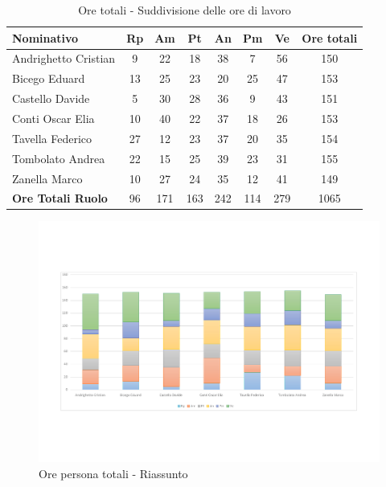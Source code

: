\documentclass[../PianoProgetto.tex]{subfiles}
\begin{document}
	\begin{table}[H]
		\begin{tabularx}{\textwidth}{l  * {6}{C}  c}
			\toprule
			\textbf{Nominativo} & \textbf{Rp} & \textbf{Am} & \textbf{Pt} 
						& \textbf{An} & \textbf{Pm} & \textbf{Ve} & \textbf{Ore totali} \\
			\midrule
			Andrighetto Cristian  & 9  & 22 & 18 & 38 & 7  & 56 & 150 \\
			Bicego Eduard  & 13 & 25 & 23 & 20 & 25 & 47 & 153 \\
			Castello Davide  & 5  & 30 & 28 & 36 & 9  & 43 & 151 \\
			Conti Oscar Elia  & 10 & 40 & 22 & 37 & 18 & 26 & 153 \\
			Tavella Federico  & 27 & 12 & 23 & 37 & 20 & 35 & 154 \\
			Tombolato Andrea  & 22 & 15 & 25 & 39 & 23 & 31 & 155 \\
			Zanella Marco & 10 & 27 & 24 & 35 & 12 & 41 & 149 \\
			\midrule
			\textbf{Ore Totali Ruolo} & 96    & 171   & 163   & 242   & 114   & 279   & 1065 \\
			\bottomrule
		\end{tabularx}
		\caption{Ore totali - Suddivisione delle ore di lavoro}
		\label{tab:totale_ore}
	\end{table}
	
\newpage
\vfill
		
	\begin{figure}[H]
		\centering
		\includegraphics[width=\textwidth , trim=2cm 4cm 2cm 4cm]{grafici/Riepilogo/Totali/ore-persona}
			\caption{Ore persona totali - Riassunto}
		\label{fig:BarChart-totale_ore}
	\end{figure}
	
\end{document}
